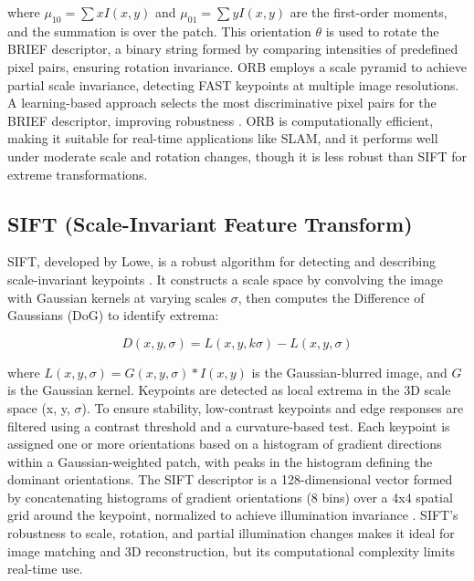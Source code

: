 \documentclass[journal]{IEEEtran}
\begin{document}
where \( \mu_{10} = \sum x I(x, y) \) and \( \mu_{01} = \sum y I(x, y) \) are the first-order moments, and the summation is over the patch. This orientation \( \theta \) is used to rotate the BRIEF descriptor, a binary string formed by comparing intensities of predefined pixel pairs, ensuring rotation invariance. ORB employs a scale pyramid to achieve partial scale invariance, detecting FAST keypoints at multiple image resolutions. A learning-based approach selects the most discriminative pixel pairs for the BRIEF descriptor, improving robustness \cite{ORB}. ORB is computationally efficient, making it suitable for real-time applications like SLAM, and it performs well under moderate scale and rotation changes, though it is less robust than SIFT for extreme transformations.\\

\subsection{SIFT (Scale-Invariant Feature Transform)}
SIFT, developed by Lowe, is a robust algorithm for detecting and describing scale-invariant keypoints \cite{SIFT}. It constructs a scale space by convolving the image with Gaussian kernels at varying scales \( \sigma \), then computes the Difference of Gaussians (DoG) to identify extrema:

\begin{equation}
D(x, y, \sigma) = L(x, y, k\sigma) - L(x, y, \sigma)
\end{equation}

where \( L(x, y, \sigma) = G(x, y, \sigma) * I(x, y) \) is the Gaussian-blurred image, and \( G \) is the Gaussian kernel. Keypoints are detected as local extrema in the 3D scale space (x, y, \( \sigma \)). To ensure stability, low-contrast keypoints and edge responses are filtered using a contrast threshold and a curvature-based test. Each keypoint is assigned one or more orientations based on a histogram of gradient directions within a Gaussian-weighted patch, with peaks in the histogram defining the dominant orientations. The SIFT descriptor is a 128-dimensional vector formed by concatenating histograms of gradient orientations (8 bins) over a 4x4 spatial grid around the keypoint, normalized to achieve illumination invariance \cite{SIFT}. SIFT’s robustness to scale, rotation, and partial illumination changes makes it ideal for image matching and 3D reconstruction, but its computational complexity limits real-time use.\\
\end{document}
